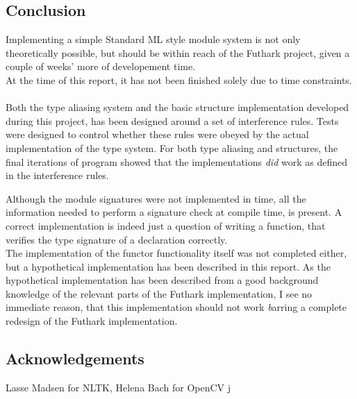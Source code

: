 \subsection{Conclusion}
Implementing a simple Standard ML style module system is not only theoretically
possible, but should be within reach of the Futhark project, given a couple of
weeks' more of developement time.
\\
At the time of this report, it has not been finished solely due to time constraints.
\\
\\
Both the type aliasing system and the basic structure implementation developed
during this project, has been designed around a set of interference rules.
Tests were designed to control whether these rules were obeyed by the actual
implementation of the type system.
For both type aliasing and structures, the final iterations of program showed
that the implementations \textit{did} work as defined in the interference rules.

Although the module signatures were not implemented in time, all the information
needed to perform a signature check at compile time, is present. A correct
implementation is indeed just a question of writing a function, that verifies
the type signature of a declaration correctly.
\\
The implementation of the functor functionality itself was not completed either,
but a hypothetical implementation has been described in this report.
As the hypothetical implementation has been described from a good background knowledge
of the relevant parts of the Futhark implementation, I see no immediate reason,
that this implementation should not work \emph barring a complete redesign of
the Futhark implementation.

\subsection{Acknowledgements}
\label{subsec:label}
Lasse Madsen for NLTK, Helena Bach for OpenCV
j